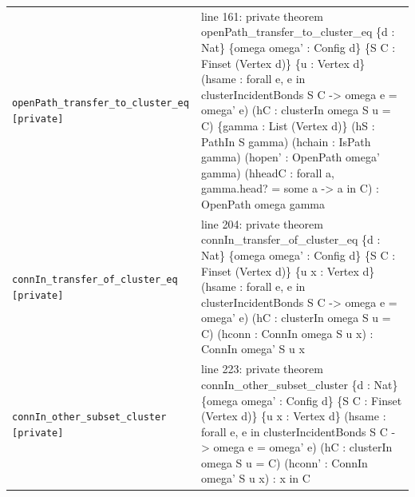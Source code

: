 \documentclass[10pt]{article}
\begin{document}
\begin{longtable}{>{\raggedright\arraybackslash}p{} >{\raggedright\arraybackslash}p{}}
\texttt{openPath\_\allowbreak{}transfer\_\allowbreak{}to\_\allowbreak{}cluster\_\allowbreak{}eq [private]} & {\ttfamily\scriptsize line 161:\allowbreak{} private theorem openPath\_\allowbreak{}transfer\_\allowbreak{}to\_\allowbreak{}cluster\_\allowbreak{}eq \{d :\allowbreak{} Nat\} \{omega omega' :\allowbreak{} Config d\} \{S C :\allowbreak{} Finset (\allowbreak{}Vertex d)\allowbreak{}\} \{u :\allowbreak{} Vertex d\} (\allowbreak{}hsame :\allowbreak{} forall e,\allowbreak{} e in clusterIncidentBonds S C -\allowbreak{}> omega e =\allowbreak{} omega' e)\allowbreak{} (\allowbreak{}hC :\allowbreak{} clusterIn omega S u =\allowbreak{} C)\allowbreak{} \{gamma :\allowbreak{} List (\allowbreak{}Vertex d)\allowbreak{}\} (\allowbreak{}hS :\allowbreak{} PathIn S gamma)\allowbreak{} (\allowbreak{}hchain :\allowbreak{} IsPath gamma)\allowbreak{} (\allowbreak{}hopen' :\allowbreak{} OpenPath omega' gamma)\allowbreak{} (\allowbreak{}hheadC :\allowbreak{} forall a,\allowbreak{} gamma.\allowbreak{}head? =\allowbreak{} some a -\allowbreak{}> a in C)\allowbreak{} :\allowbreak{} OpenPath omega gamma} \\[0.45em]
\texttt{connIn\_\allowbreak{}transfer\_\allowbreak{}of\_\allowbreak{}cluster\_\allowbreak{}eq [private]} & {\ttfamily\scriptsize line 204:\allowbreak{} private theorem connIn\_\allowbreak{}transfer\_\allowbreak{}of\_\allowbreak{}cluster\_\allowbreak{}eq \{d :\allowbreak{} Nat\} \{omega omega' :\allowbreak{} Config d\} \{S C :\allowbreak{} Finset (\allowbreak{}Vertex d)\allowbreak{}\} \{u x :\allowbreak{} Vertex d\} (\allowbreak{}hsame :\allowbreak{} forall e,\allowbreak{} e in clusterIncidentBonds S C -\allowbreak{}> omega e =\allowbreak{} omega' e)\allowbreak{} (\allowbreak{}hC :\allowbreak{} clusterIn omega S u =\allowbreak{} C)\allowbreak{} (\allowbreak{}hconn :\allowbreak{} ConnIn omega S u x)\allowbreak{} :\allowbreak{} ConnIn omega' S u x} \\[0.45em]
\texttt{connIn\_\allowbreak{}other\_\allowbreak{}subset\_\allowbreak{}cluster [private]} & {\ttfamily\scriptsize line 223:\allowbreak{} private theorem connIn\_\allowbreak{}other\_\allowbreak{}subset\_\allowbreak{}cluster \{d :\allowbreak{} Nat\} \{omega omega' :\allowbreak{} Config d\} \{S C :\allowbreak{} Finset (\allowbreak{}Vertex d)\allowbreak{}\} \{u x :\allowbreak{} Vertex d\} (\allowbreak{}hsame :\allowbreak{} forall e,\allowbreak{} e in clusterIncidentBonds S C -\allowbreak{}> omega e =\allowbreak{} omega' e)\allowbreak{} (\allowbreak{}hC :\allowbreak{} clusterIn omega S u =\allowbreak{} C)\allowbreak{} (\allowbreak{}hconn' :\allowbreak{} ConnIn omega' S u x)\allowbreak{} :\allowbreak{} x in C} \\[0.45em]

\end{longtable}
\end{document}
